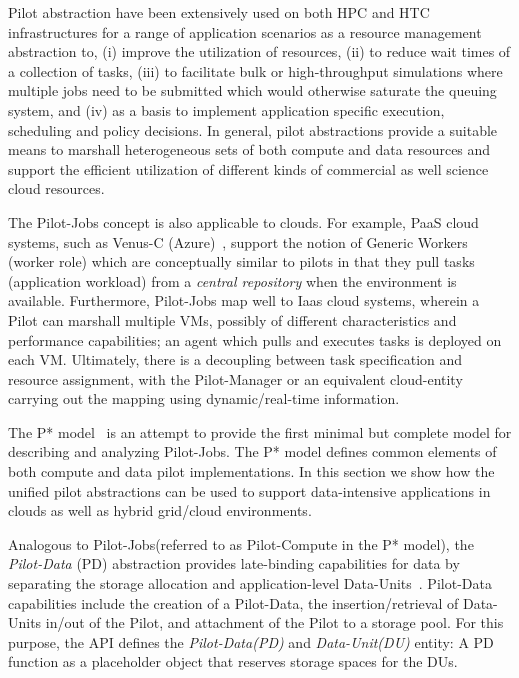 \documentclass[times]{cpeauth}
\newcommand{\pilot}{Pilot\xspace}
\newcommand{\pilotjobs}{Pilot-Jobs\xspace}
\newcommand{\pilotcompute}{Pilot-Compute\xspace}
\newcommand{\pilotdata}{Pilot-Data\xspace}
\newcommand{\pd}{PD\xspace}
\newcommand{\dataunit}{Data-Unit\xspace}
\newcommand{\dataunits}{Data-Units\xspace}
\newcommand{\dus}{DUs\xspace}
\begin{document}
\pilot abstraction have been extensively used on both HPC and HTC
infrastructures for a range of application scenarios as a resource
management abstraction to, (i) improve the utilization of resources,
(ii) to reduce wait times of a collection of tasks, (iii) to
facilitate bulk or high-throughput simulations where multiple jobs
need to be submitted which would otherwise saturate the queuing
system, and (iv) as a basis to implement application specific
execution, scheduling and policy decisions.  In general, pilot
abstractions provide a suitable means to marshall heterogeneous sets
of both compute and data resources and support the efficient
utilization of different kinds of commercial as well science cloud
resources.  

The \pilotjobs concept is also applicable to clouds. For example, PaaS
cloud systems, such as Venus-C (Azure)~\cite{venusc-generic-worker},
support the notion of Generic Workers (worker role) which are
conceptually similar to pilots in that they pull tasks (application
workload) from a {\it central repository} when the environment is
available. Furthermore, \pilotjobs map well to Iaas cloud systems,
wherein a \pilot can marshall multiple VMs, possibly of different
characteristics and performance capabilities; an agent which pulls and
executes tasks is deployed on each VM. Ultimately, there is a
decoupling between task specification and resource assignment, with
the \pilot-Manager or an equivalent cloud-entity carrying out the
mapping using dynamic/real-time information. 
 
The P* model~\cite{pstar12} is an attempt to provide the first minimal but
complete model for describing and analyzing \pilotjobs. The P* model defines
common elements of both compute and data pilot implementations. In this 
section we show how the unified pilot abstractions can be used to support 
data-intensive applications in clouds as well as hybrid grid/cloud 
environments.

Analogous to \pilotjobs (referred to as \pilotcompute in the P* model), the
{\it Pilot-Data} (PD) abstraction provides late-binding capabilities for data
by separating the storage allocation and application-level
\dataunits~\cite{pstar12}. \pilotdata capabilities include the creation of a 
\pilotdata, the insertion/retrieval of Data-Units in/out of the \pilot, and 
attachment of the \pilot to a storage pool. For this purpose, the API defines 
the {\it \pilotdata (PD)} and {\it \dataunit (DU)} entity: A \pd function as a
placeholder object that reserves storage spaces for the \dus. 
\end{document}
